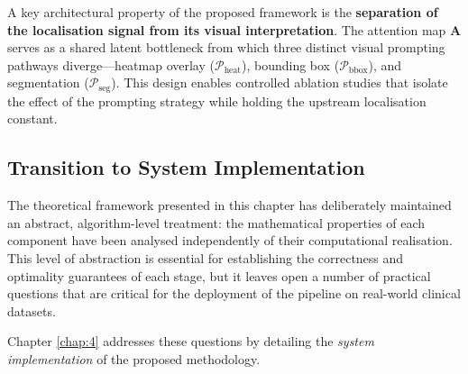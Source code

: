 A key architectural property of the proposed framework is the \textbf{separation of the localisation signal from its visual interpretation}. The attention map $\mathbf{A}$ serves as a shared latent bottleneck from which three distinct visual prompting pathways diverge---heatmap overlay ($\mathcal{P}_{\text{heat}}$), bounding box ($\mathcal{P}_{\text{bbox}}$), and segmentation ($\mathcal{P}_{\text{seg}}$). This design enables controlled ablation studies that isolate the effect of the prompting strategy while holding the upstream localisation constant.

\subsection{Transition to System Implementation}

The theoretical framework presented in this chapter has deliberately maintained an abstract, algorithm-level treatment: the mathematical properties of each component have been analysed independently of their computational realisation. This level of abstraction is essential for establishing the correctness and optimality guarantees of each stage, but it leaves open a number of practical questions that are critical for the deployment of the pipeline on real-world clinical datasets.

Chapter \ref{chap:4} addresses these questions by detailing the \textit{system implementation} of the proposed methodology.

